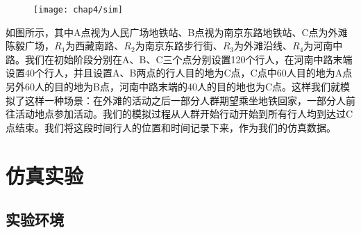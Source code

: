 \begin{figure}[!htp]
    \centering
    \texttt{[image: chap4/sim]}
\end{figure} 
如图所示，其中A点视为人民广场地铁站、B点视为南京东路地铁站、C点为外滩陈毅广场，$R_1$为西藏南路、$R_2$为南京东路步行街、$R_3$为外滩沿线、$R_4$为河南中路。我们在初始阶段分别在A、B、C三个点分别设置120个行人，在河南中路末端设置40个行人，并且设置A、B两点的行人目的地为C点，C点中60人目的地为A点另外60人的目的地为B点，河南中路末端的40人的目的地也为C点。这样我们就模拟了这样一种场景：在外滩的活动之后一部分人群期望乘坐地铁回家，一部分人前往活动地点参加活动。我们的模拟过程从人群开始行动开始到所有行人均到达过C点结束。我们将这段时间行人的位置和时间记录下来，作为我们的仿真数据。

\section{仿真实验}

\subsection{实验环境}

